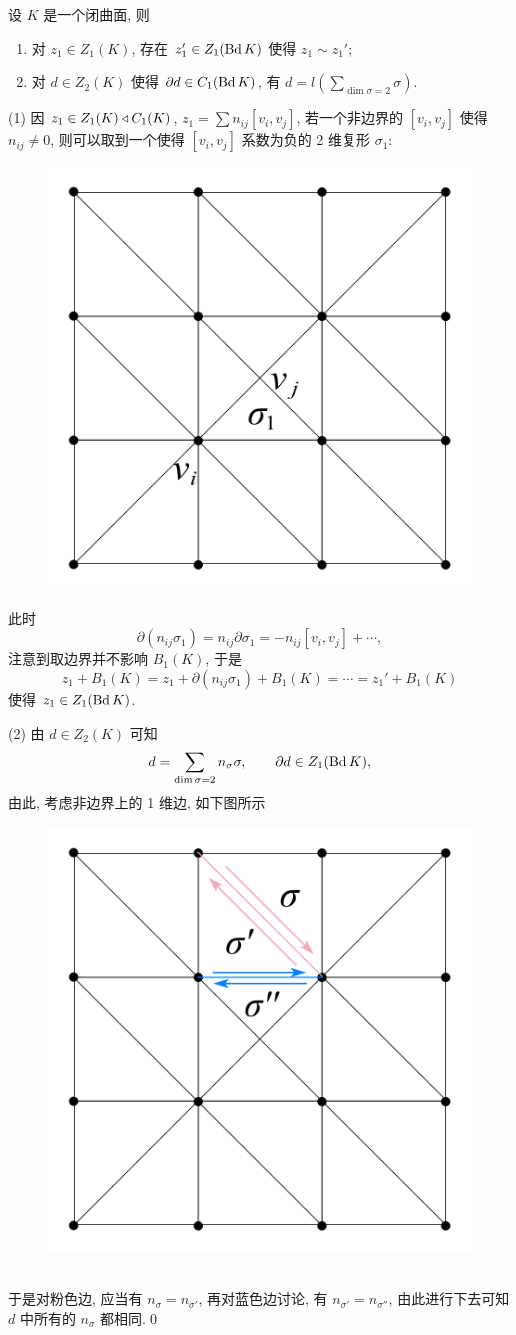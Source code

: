     \begin{Lemma}\label{lem:推到边界复形}
        设 $ K $ 是一个闭曲面, 则
        \begin{enumerate}[(1)]
            \item 对 $ z_1\in Z_1(K) $, 存在 $ z_1'\in Z_1(\mathrm{Bd}\, K) $ 使得 $ z_1\sim z_1' $;
            \item 对 $ d\in Z_2(K) $ 使得 $ \partial d\in C_1(\mathrm{Bd}\, K) $, 有 $ d=l\left(\sum_{\dim\sigma=2}\sigma\right) $.
        \end{enumerate}
    \end{Lemma}
    \begin{Proof}
        (1) 因 $ z_1\in Z_1(K)\triangleleft C_1(K) $, $ z_1=\sum n_{ij}[v_i,v_j] $, 若一个非边界的 $ [v_i,v_j] $ 使得 $ n_{ij}\ne 0 $, 则可以取到一个使得 $ [v_i,v_j] $ 系数为负的 2 维复形 $ \sigma_1 $:
        \begin{figure}[h]
            \centering
            \includegraphics[width=0.25\linewidth]{figures/Sec3-8.png}
        \end{figure}
        
        此时
        \[
            \partial(n_{ij}\sigma_1)=n_{ij}\partial\sigma_1=-n_{ij}[v_i,v_j]+\cdots,
        \]
        注意到取边界并不影响 $ B_1(K) $, 于是
        \[
            z_1+B_1(K)=z_1+\partial(n_{ij}\sigma_1)+B_1(K)=\cdots=z_1'+B_1(K)
        \]
        使得 $ z_1\in Z_1(\mathrm{Bd}\, K) $.

        (2) 由 $ d\in Z_2(K) $ 可知
        \[
            d=\sum_{\dim\sigma=2}n_\sigma\sigma,\qquad\partial d\in Z_1(\mathrm{Bd}\, K),
        \]
        由此, 考虑非边界上的 1 维边, 如下图所示
        \begin{figure}[htbp]
            \centering
            \includegraphics[width=0.25\linewidth]{figures/Sec3-9.png}
        \end{figure}
        ~\\于是对粉色边, 应当有 $ n_\sigma=n_{\sigma'} $, 再对蓝色边讨论, 有 $ n_{\sigma'}=n_{\sigma''} $, 由此进行下去可知 $ d $ 中所有的 $ n_\sigma $ 都相同.\qed
    \end{Proof}

